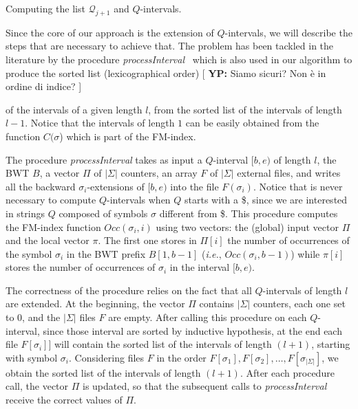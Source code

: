 \documentclass[runningheads,envcountsame,a4paper]{llncs}
\makeatletter
\newcommand{\paragrafo}{%
  \@startsection{paragraph}{4}{\z@ }{-7\p@ \@plus -4\p@ \@minus -4\p@
  }{-0.5em \@plus -0.22em \@minus -0.1em}{\normalfont \normalsize \itshape
  }
}
\newcommand{\notaestesa}[2]{%
 \marginpar{\color{red!75!black}\textbf{\texttimes}}%
 {\color{red!75!black}%
 [\,\textbullet\,\textsf{\textbf{#1:}} %
 \textsf{\footnotesize#2}\,\textbullet\,]}%
}
\newcommand{\YP}[1]{\notaestesa{YP}{#1}}
\newcommand{\ie}{\textit{i.e.}\xspace}
\newcommand{\Occ}{\ensuremath{\textit{Occ}}}
\makeatother
\begin{document}


\paragrafo{Computing  the list $\mathcal{Q}_{j+1} $ and $Q$-intervals.}

Since the core of our approach is the extension of $Q$-intervals, we will
describe the steps that are necessary to achieve that.
The problem has been tackled in the literature by
the procedure \emph{processInterval}~\cite{Cox2012} which is also used in our algorithm to produce the sorted list
(lexicographical order)
\YP{Siamo sicuri? Non è in ordine di indice?}
of the intervals of a given length $l$, from the
sorted list of the intervals of length $l-1$. Notice that the intervals of length $1$
can be easily obtained from the  function $C(\sigma$) which is part of the FM-index.

The procedure \emph{processInterval} takes as input a $Q$-interval $[b,e)$ of
length $l$, the BWT $B$, a vector $\Pi$ of $|\Sigma|$ counters, an array $F$ of
$|\Sigma|$ external files, and writes all the backward $\sigma_i$-extensions of
$[b,e)$ into the file $F(\sigma_{i})$.
Notice that is never necessary to compute $Q$-intervals when $Q$ starts with a \$, since we are interested in strings $Q$ composed of symbols $\sigma$ different from \$.
This procedure computes the FM-index function $\Occ(\sigma_i, i)$ using two
vectors: the (global) input vector $\Pi$ and the local vector $\pi$.
The first one stores in $\Pi[i]$ the number of occurrences of  the symbol
$\sigma_i$ in the BWT prefix $B[1,b-1]$ (\ie, $\Occ(\sigma_{i}, b-1)$) while
$\pi[i]$ stores the number of occurrences of $\sigma_i$ in the interval $[b,e)$.

The correctness of the procedure relies on the fact that all $Q$-intervals of
length $l$ are extended.
At the beginning, the vector $\Pi$ contains $|\Sigma|$ counters, each one set to $0$, and the $|\Sigma|$ files $F$ are empty.
After calling this procedure on each $Q$-interval, since those interval are
sorted by inductive hypothesis,  at the end each file $F[\sigma_{i}]]$ will
contain the sorted list of the intervals of length $(l+1)$, starting with symbol
$\sigma_i$.
Considering files $F$ in the order $F[\sigma_{1}], F[\sigma_{2}], \ldots
,F[\sigma_{|\Sigma|}]$, we obtain the sorted list of the intervals of length
$(l+1)$.
After each procedure call, the vector $\Pi$ is updated, so that the subsequent
calls to \emph{processInterval} receive the correct values of $\Pi$.
\end{document}
